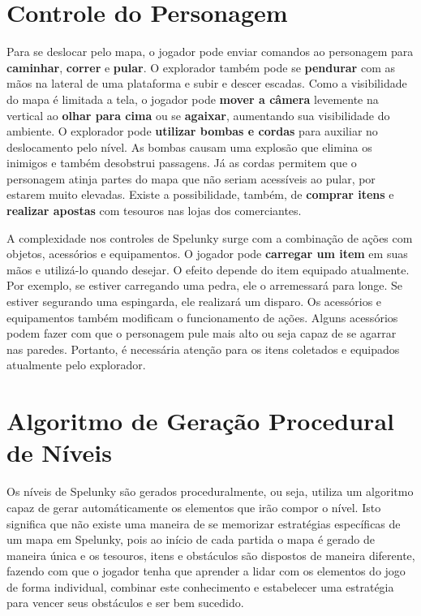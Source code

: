\section{\label{section:spelunky-controls}Controle do Personagem}
Para se deslocar pelo mapa, o jogador pode enviar comandos ao personagem para
\textbf{caminhar}, \textbf{correr} e \textbf{pular}. O explorador também pode se
\textbf{pendurar} com as mãos na lateral de uma plataforma e subir e descer
escadas. Como a visibilidade do mapa é limitada a tela, o jogador pode
\textbf{mover a câmera} levemente na vertical ao \textbf{olhar para cima} ou se
\textbf{agaixar}, aumentando sua visibilidade do ambiente. O explorador pode
\textbf{utilizar bombas e cordas} para auxiliar no deslocamento pelo nível. As
bombas causam uma explosão que elimina os inimigos e também desobstrui
passagens. Já as cordas permitem que o personagem atinja partes do mapa que não
seriam acessíveis ao pular, por estarem muito elevadas. Existe a possibilidade,
também, de \textbf{comprar itens} e \textbf{realizar apostas} com tesouros nas
lojas dos comerciantes.

A complexidade nos controles de Spelunky surge com a combinação de ações com
objetos, acessórios e equipamentos. O jogador pode \textbf{carregar um
item} em suas mãos e utilizá-lo quando desejar. O efeito depende do item
equipado atualmente. Por exemplo, se estiver carregando uma pedra, ele o
arremessará para longe. Se estiver segurando uma espingarda, ele realizará um
disparo. Os acessórios e equipamentos também modificam o funcionamento de ações.
Alguns acessórios podem fazer com que o personagem pule mais alto ou seja capaz
de se agarrar nas paredes. Portanto, é necessária atenção para os itens
coletados e equipados atualmente pelo explorador.


\section{\label{section:spelunky-procgen}Algoritmo de Geração Procedural de
Níveis}
Os níveis de Spelunky são gerados proceduralmente, ou seja, utiliza
um algoritmo capaz de gerar automáticamente os elementos que irão compor o
nível. Isto significa que não existe uma maneira de se memorizar estratégias
específicas de um mapa em Spelunky, pois ao início de cada partida o mapa é
gerado de maneira única e os tesouros, itens e obstáculos são dispostos de
maneira diferente, fazendo com que o jogador tenha que aprender a lidar com os
elementos do jogo de forma individual, combinar este conhecimento e estabelecer
uma estratégia para vencer seus obstáculos e ser bem sucedido.

